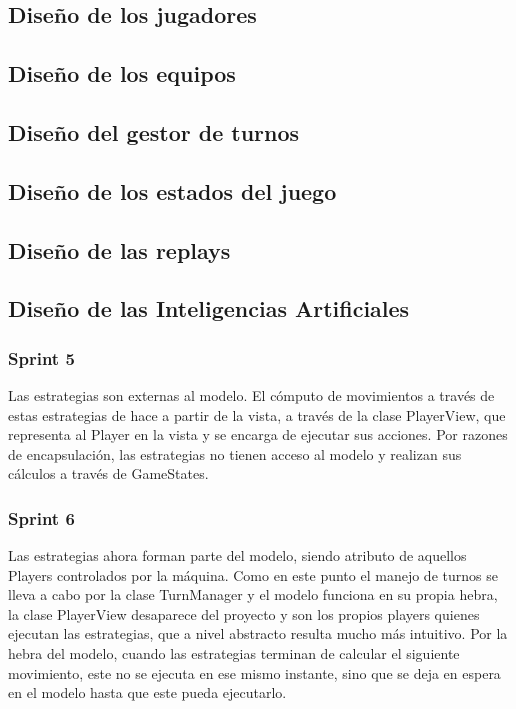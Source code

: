 \documentclass{article}
\theoremstyle{break}
\begin{document}
\subsection{Diseño de los jugadores}

\subsection{Diseño de los equipos}

\subsection{Diseño del gestor de turnos}

\subsection{Diseño de los estados del juego}

\subsection{Diseño de las replays}

\subsection{Diseño de las Inteligencias Artificiales}
\subsubsection{Sprint 5}
Las estrategias son externas al modelo. El cómputo de movimientos a través de estas estrategias de hace a partir de la vista, a través de la clase PlayerView, que representa al Player en la vista y se encarga de ejecutar sus acciones. Por razones de encapsulación, las estrategias no tienen acceso al modelo y realizan sus cálculos a través de GameStates.
\subsubsection{Sprint 6}
Las estrategias ahora forman parte del modelo, siendo atributo de aquellos Players controlados por la máquina. Como en este punto el manejo de turnos se lleva a cabo por la clase TurnManager y el modelo funciona en su propia hebra, la clase PlayerView desaparece del proyecto y son los propios players quienes ejecutan las estrategias, que a nivel abstracto resulta mucho más intuitivo. Por la hebra del modelo, cuando las estrategias terminan de calcular el siguiente movimiento, este no se ejecuta en ese mismo instante, sino que se deja en espera en el modelo hasta que este pueda ejecutarlo.
\end{document}
